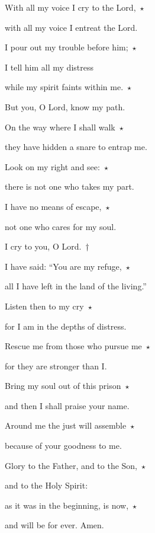 \noindent With all my voice I cry to the Lord,~$\star$~\nopagebreak

with all my voice I entreat the Lord.

\noindent I pour out my trouble before him;~$\star$~\nopagebreak

I tell him all my distress

\noindent while my spirit faints within me.~$\star$~\nopagebreak

But you, O Lord, know my path.

\noindent On the way where I shall walk~$\star$~\nopagebreak

they have hidden a snare to entrap me.

\noindent Look on my right and see:~$\star$~\nopagebreak

there is not one who takes my part.

\noindent I have no means of escape,~$\star$~\nopagebreak

not one who cares for my soul.

\noindent I cry to you, O Lord.~†~\nopagebreak

I have said: “You are my refuge,~$\star$~\nopagebreak

all I have left in the land of the living.”

\noindent Listen then to my cry~$\star$~\nopagebreak

for I am in the depths of distress.

\noindent Rescue me from those who pursue me~$\star$~\nopagebreak

for they are stronger than I.

\noindent Bring my soul out of this prison~$\star$~\nopagebreak

and then I shall praise your name.

\noindent Around me the just will assemble~$\star$~\nopagebreak

because of your goodness to me.

\noindent Glory to the Father, and to the Son,~$\star$~\nopagebreak

and to the Holy Spirit:

\noindent as it was in the beginning, is now,~$\star$~\nopagebreak

and will be for ever. Amen.
